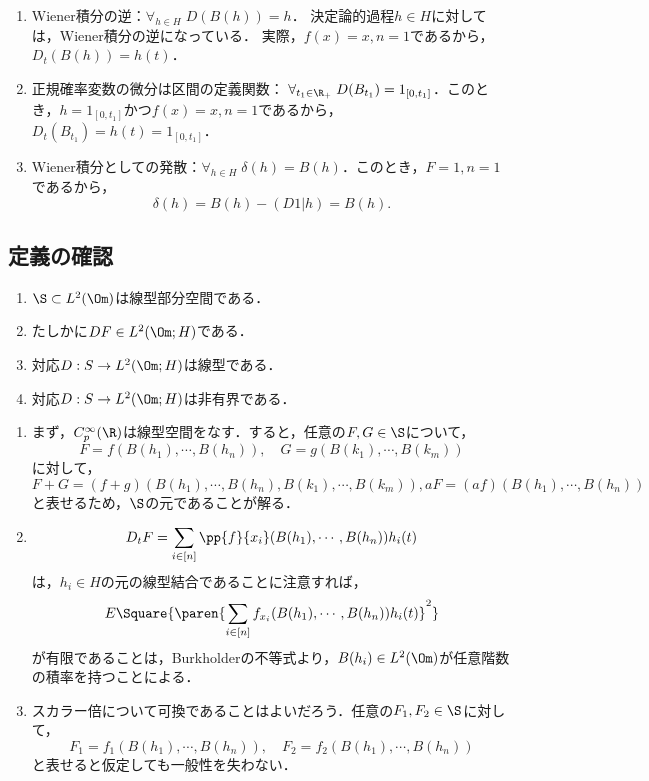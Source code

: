 \documentclass[uplatex,dvipdfmx]{jsreport}
\begin{document}
\begin{example}\mbox{}
    \begin{enumerate}
        \item Wiener積分の逆：$\forall_{h\in H}\;D(B(h))=h$．
        決定論的過程$h\in H$に対しては，Wiener積分の逆になっている．
        実際，$f(x)=x,n=1$であるから，$D_t(B(h))=h(t)$．
        \item 正規確率変数の微分は区間の定義関数：
        $\forall_{t_1\in\R_+}\;D(B_{t_1})=1_{[0,t_1]}$．このとき，$h=1_{[0,t_1]}$かつ$f(x)=x,n=1$であるから，$D_t(B_{t_1})=h(t)=1_{[0,t_1]}$．
        \item Wiener積分としての発散：$\forall_{h\in H}\;\delta(h)=B(h)$．このとき，$F=1,n=1$であるから，
        \[\delta(h)=B(h)-(D1|h)=B(h).\]
    \end{enumerate}
\end{example}

\subsection{定義の確認}

\begin{lemma}\mbox{}
    \begin{enumerate}
        \item $\S\subset L^2(\Om)$は線型部分空間である．
        \item たしかに$DF\in L^2(\Om;H)$である．
        \item 対応$D:S\to L^2(\Om;H)$は線型である．
        \item 対応$D:S\to L^2(\Om;H)$は非有界である．
    \end{enumerate}
\end{lemma}
\begin{Proof}\mbox{}
    \begin{enumerate}
        \item まず，$C_p^\infty(\R)$は線型空間をなす．すると，任意の$F,G\in\S$について，
        \[F=f(B(h_1),\cdots,B(h_n)),\quad G=g(B(k_1),\cdots,B(k_m))\]
        に対して，$F+G=(f+g)(B(h_1),\cdots,B(h_n),B(k_1),\cdots,B(k_m)),aF=(af)(B(h_1),\cdots,B(h_n))$と表せるため，$\S$の元であることが解る．
        \item \[D_tF=\sum_{i\in[n]}\pp{f}{x_i}(B(h_1),\cdots,B(h_n))h_i(t)\]
        は，$h_i\in H$の元の線型結合であることに注意すれば，
        \[E\Square{\paren{\sum_{i\in[n]}f_{x_i}(B(h_1),\cdots,B(h_n))h_i(t)}^2}\]
        が有限であることは，Burkholderの不等式より，$B(h_i)\in L^2(\Om)$が任意階数の積率を持つことによる．
        \item スカラー倍について可換であることはよいだろう．任意の$F_1,F_2\in\S$に対して，
        \[F_1=f_1(B(h_1),\cdots,B(h_n)),\quad F_2=f_2(B(h_1),\cdots,B(h_n))\]
        と表せると仮定しても一般性を失わない．
    \end{enumerate}
\end{Proof}
\end{document}
